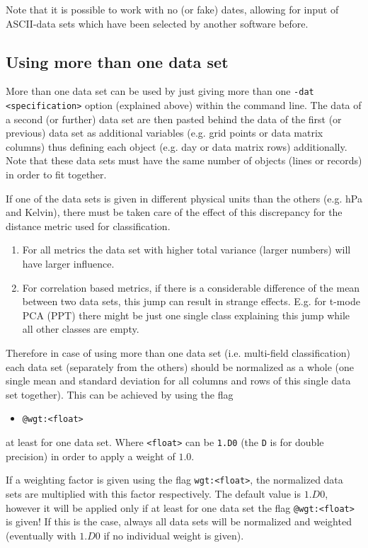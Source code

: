 \documentclass[12pt, oneside, a4paper, headsepline, plainheadsepline]{scrbook}
\begin{document}
Note that it is possible to work with no (or fake) dates, allowing for input of ASCII-data sets 
which have been selected by another software before.


\subsection{Using more than one data set}

More than one data set can be used by just giving more than one
\verb+-dat <specification>+ option (explained above) within the command line. 
The data of a second (or further) data set are then pasted behind the data of the first 
(or previous) data set as additional variables (e.g. grid points or data matrix 
columns) thus defining each object (e.g. day or data matrix rows) additionally.
Note that these data sets must have the same number of objects (lines or records) in order 
to fit together.

If one of the data sets is given in different physical units than the others (e.g. hPa and Kelvin), 
there must be taken care of the effect of this discrepancy for the distance metric used for 
classification.

\begin{enumerate}
\item For all metrics the data set with higher total variance (larger numbers) will have larger influence.
\item For correlation based metrics, if there is a considerable difference of the mean between two data sets, 
this jump can result in strange effects. E.g. for t-mode PCA (PPT) there might be just one single class explaining this jump
while all other classes are empty. 
\end{enumerate}

Therefore in case of using more than one data set (i.e. multi-field classification) each data set 
(separately from the others) should be normalized as a whole (one single mean and standard deviation 
for all columns and rows of this single data set together). This can be achieved by using the flag
\begin{itemize}
\item \verb+@wgt:<float>+
\end{itemize}
at least for one data set. Where \verb+<float>+ can be \verb+1.D0+ (the \verb+D+ is for double precision) 
in order to apply a weight of $1.0$.

If a weighting factor is given using the flag \verb+wgt:<float>+, 
the normalized data sets are multiplied with this factor respectively. 
The default value is $1.D0$, however it will be applied only if at least for one data set the flag
\verb+@wgt:<float>+ is given! If this is the case, always all data sets will be normalized and weighted
(eventually with $1.D0$ if no individual weight is given).
\end{document}
